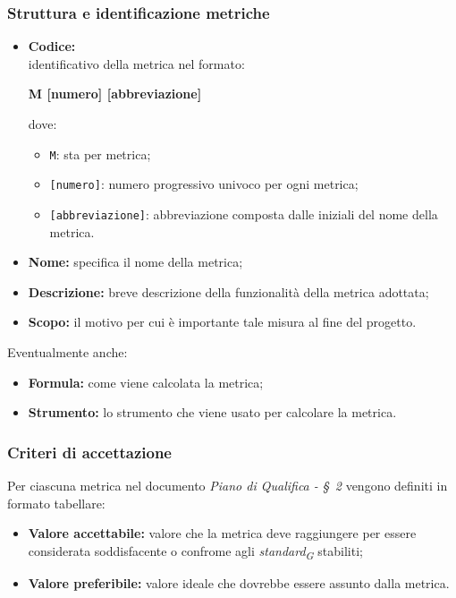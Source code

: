 \subsubsection{Struttura e identificazione metriche}
\begin{itemize}
    \item \textbf{Codice:} \\
    identificativo della metrica nel formato:
        \begin{center}
            \textbf{M [numero] [abbreviazione]}
        \end{center}
        dove:
        \begin{itemize}
            \item \texttt{M}: sta per metrica;
            \item \texttt{[numero]}: numero progressivo univoco per ogni metrica;
            \item \texttt{[abbreviazione]}: abbreviazione composta dalle iniziali del nome della metrica.
        \end{itemize}
    \item \textbf{Nome:} specifica il nome della metrica;
    \item \textbf{Descrizione:} breve descrizione della funzionalità della metrica adottata;
    \item \textbf{Scopo:} il motivo per cui è importante tale misura al fine del progetto.
\end{itemize}
    \vspace{0.2cm}
Eventualmente anche:
\begin{itemize}
    \item \textbf{Formula:} come viene calcolata la metrica;
    \item \textbf{Strumento:} lo strumento che viene usato per calcolare la metrica.
\end{itemize}

\subsubsection{Criteri di accettazione}
Per ciascuna metrica nel documento \textit{Piano di Qualifica - \S~2} vengono definiti in formato tabellare:
\begin{itemize}
    \item \textbf{Valore accettabile:} valore che la metrica deve raggiungere per essere considerata soddisfacente o confrome agli \textit{standard}\textsubscript{\textit{G}} stabiliti;
    \item \textbf{Valore preferibile:} valore ideale che dovrebbe essere assunto dalla metrica.
\end{itemize}

